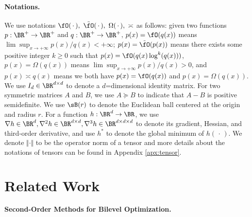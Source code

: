 \documentclass{article}
\begin{document}
\paragraph{Notations.}
We use notations $\fO(\,\cdot\,),~ \tilde \fO(\,\cdot\,),~ \Omega(\,\cdot\,),~ \asymp$ as follows: given two functions $p: \BR^+ \rightarrow \BR^+$ and $q: \BR^+ \rightarrow \BR^+$,  $p(x) = \fO(q(x))$ means $ \lim \sup_{x \rightarrow +\infty} {p(x)}/{q(x)} < +\infty $; $p(x) = \tilde \fO(p(x)) $ means there exists some positive integer $k \ge 0$ such that $p(x) = \fO(q(x) \log^k (q(x)))$, $p(x) = \Omega(q(x))$ means $ \lim \sup_{x \rightarrow + \infty} p(x) / q(x) >0$, and $p(x) \asymp q(x)$ means we both have $p(x) = \fO(q(x))$ and $p(x) = \Omega(q(x))$.
We use $I_d \in \BR^{d\times d}$ to denote a $d$=dimensional identity matrix. For two symmetric matrices $A$ and $B$, we use $A \succeq B$ to indicate that $A-B$ is positive semidefinite.
We use $\sB(r)$ to denote the Euclidean ball centered at the origin and radius $r$.
For a function $h: \BR^d \rightarrow \BR$, we use $\nabla h \in \BR^d, \nabla^2 h \in \BR^{d \times d},  \nabla^3 h \in \BR^{d \times d \times d}$ to denote its gradient, Hessian, and third-order derivative, and use $h^*$ to denote the global minimum of $h(\,\cdot\,)$. We
denote $\Vert \cdot\Vert$ to be the operator norm of a tensor and more details about the notations of tensors can be found in Appendix \ref{apx:tensor}.

\section{Related Work}


\paragraph{Second-Order Methods for Bilevel Optimization.
} 
\end{document}

